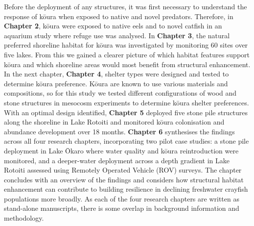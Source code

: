 \documentclass[
  letterpaper,
  DIV=11,
  numbers=noendperiod]{scrartcl}
\begin{document}
Before the deployment of any structures, it was first necessary to
understand the response of kōura when exposed to native and novel
predators. Therefore, in \textbf{Chapter 2}, kōura were exposed to
native eels and to novel catfish in an aquarium study where refuge use
was analysed. In \textbf{Chapter 3}, the natural preferred shoreline
habitat for kōura was investigated by monitoring 60 sites over five
lakes. From this we gained a clearer picture of which habitat features
support kōura and which shoreline areas would most benefit from
structural enhancement. In the next chapter, \textbf{Chapter 4}, shelter
types were designed and tested to determine kōura preference. Kōura are
known to use various materials and compositions, so for this study we
tested different configurations of wood and stone structures in mesocosm
experiments to determine kōura shelter preferences. With an optimal
design identified, \textbf{Chapter 5} deployed five stone pile
structures along the shoreline in Lake Rotoiti and monitored kōura
colonisation and abundance development over 18 months. \textbf{Chapter
6} synthesises the findings across all four research chapters,
incorporating two pilot case studies: a stone pile deployment in Lake
Ōkaro where water quality and kōura reintroduction were monitored, and a
deeper-water deployment across a depth gradient in Lake Rotoiti assessed
using Remotely Operated Vehicle (ROV) surveys. The chapter concludes
with an overview of the findings and considers how structural habitat
enhancement can contribute to building resilience in declining
freshwater crayfish populations more broadly. As each of the four
research chapters are written as stand-alone manuscripts, there is some
overlap in background information and methodology.
\end{document}
